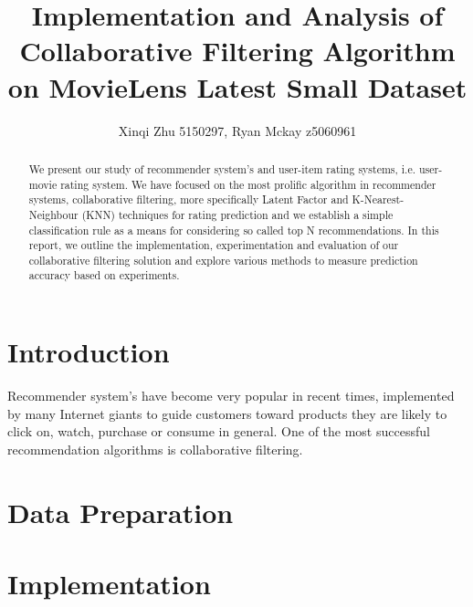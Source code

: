 \documentclass[12pt]{article}
\title{Implementation and Analysis of Collaborative Filtering Algorithm on MovieLens Latest Small Dataset}
\author{Xinqi Zhu 5150297, Ryan Mckay z5060961}
\begin{document}
 

\maketitle

\begin{abstract}
We present our study of recommender system's and user-item rating systems, i.e. user-movie rating system. We have focused on the most prolific algorithm in recommender systems, collaborative filtering, more specifically Latent Factor and K-Nearest-Neighbour (KNN) techniques for rating prediction and we establish a simple classification rule as a means for considering so called top N recommendations. In this report, we outline the implementation, experimentation and evaluation of our collaborative filtering solution and explore various methods to measure prediction accuracy based on experiments. 
\end{abstract}


\section{Introduction}

Recommender system's have become very popular in recent times, implemented by many Internet giants to guide customers toward products they are likely to click on, watch, purchase or consume in general. One of the most successful recommendation algorithms is collaborative filtering.

%



\section{Data Preparation}

\section{Implementation}
\end{document}
